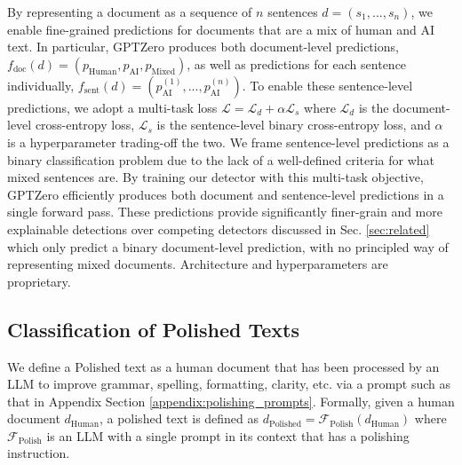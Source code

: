 \documentclass[11pt]{article}
\newcommand{\doc}{\mathrm{doc}}
\newcommand{\sent}{\mathrm{sent}}
\newcommand{\ai}{\mathrm{AI}}
\newcommand{\human}{\mathrm{Human}}
\newcommand{\mixed}{\mathrm{Mixed}}
\newcommand{\gptzero}{GPTZero}
\begin{document}
By representing a document as a sequence of $n$ sentences $d = (s_{1}, ..., s_{n})$, we enable fine-grained predictions for documents that are a mix of human and AI text.
In particular, \gptzero{} produces both document-level predictions, $f_{\doc}(d) = (p_{\human}, p_{\ai}, p_{\mixed})$, as well as predictions for each sentence individually, $f_{\sent}(d) = (p_{\ai}^{(1)}, ..., p_{\ai}^{(n)})$.
To enable these sentence-level predictions, we adopt a multi-task loss $\mathcal{L} = \mathcal{L}_{d} + \alpha \mathcal{L}_{s}$ where $\mathcal{L}_{d}$ is the document-level cross-entropy loss, $\mathcal{L}_{s}$ is the sentence-level binary cross-entropy loss, and $\alpha$ is a hyperparameter trading-off the two. 
We frame sentence-level predictions as a binary classification problem due to the lack of a well-defined criteria for what mixed sentences are. 
By training our detector with this multi-task objective, \gptzero{} efficiently produces both document and sentence-level predictions in a single forward pass.
These predictions provide significantly finer-grain and more explainable detections over competing detectors discussed in Sec. \ref{sec:related} which only predict a binary document-level prediction, with no principled way of representing mixed documents.
Architecture and hyperparameters are proprietary.

\subsection{Classification of Polished Texts}
\label{sec:polished_method}
We define a Polished text as a human document that has been processed by an LLM to improve grammar, spelling, formatting, clarity, etc. via a prompt such as that in Appendix Section \ref{appendix:polishing_prompts}. Formally, given a human document $d_{\text{Human}}$, a polished text  is defined as $d_{\text{Polished}} = \mathcal{F}_{\text{Polish}}(d_{\text{Human}})$ where $\mathcal{F}_{\text{Polish}}$ is an LLM with a single prompt in its context that has a polishing instruction.
\end{document}
